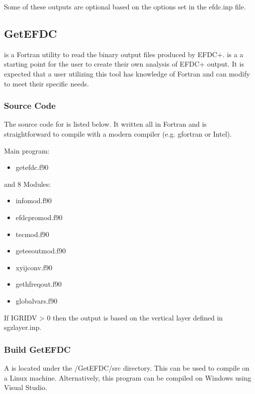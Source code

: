\documentclass[letterpaper,10pt,english]{sphinxmanual}
\begin{document}
Some of these outputs are optional based on the options set in the efdc.inp file.


\subsection{GetEFDC}
\label{\detokenize{outputfiles/getefdc:getefdc}}\label{\detokenize{outputfiles/getefdc:id1}}\label{\detokenize{outputfiles/getefdc::doc}}
 is a Fortran utility to read the binary output files produced by EFDC+.  is a a starting point for the user to create their own analysis of EFDC+ output.  It is expected that a user utilizing this tool has knowledge of Fortran and can modify  to meet their specific needs.


\subsubsection{Source Code}
\label{\detokenize{outputfiles/getefdc:source-code}}
The source code for  is listed below.  It written all in Fortran and is straightforward to compile with a modern compiler (e.g. gfortran or Intel).

Main program:
\begin{itemize}
\item {} 
getefdc.f90

\end{itemize}

and 8 Modules:
\begin{itemize}
\item {} 
infomod.f90

\item {} 
efdcpromod.f90

\item {} 
tecmod.f90

\item {} 
geteeoutmod.f90

\item {} 
xyijconv.f90

\item {} 
gethfreqout.f90

\item {} 
globalvars.f90

\end{itemize}

If IGRIDV \textgreater{} 0 then the output is based on the vertical layer defined in sgzlayer.inp.


\subsubsection{Build GetEFDC}
\label{\detokenize{outputfiles/getefdc:build-getefdc}}
A  is located under the /GetEFDC/src directory.  This can be used to compile on a Linux machine. Alternatively, this program can be compiled on Windows using Visual Studio.
\end{document}

